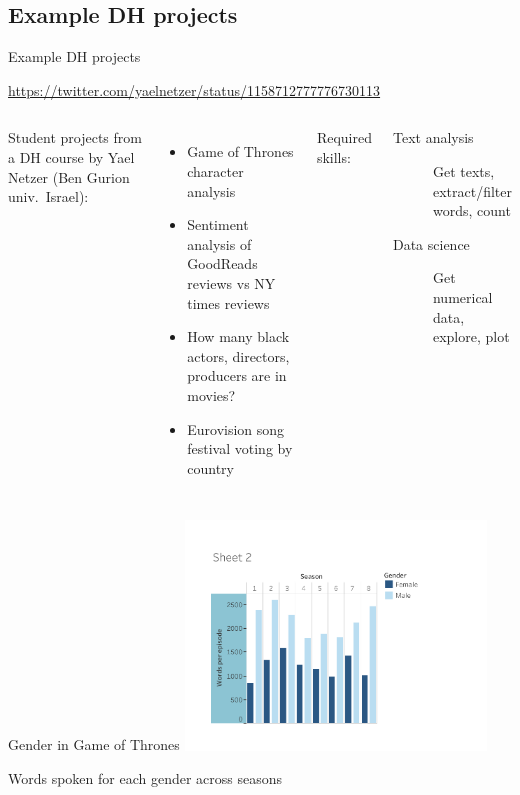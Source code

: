\documentclass[aspectratio=169,usenames,dvipsnames]{beamer}
\begin{document}
\subsection{Example DH projects}
\frame{\tableofcontents[currentsubsection]}
\begin{frame}{Example DH projects}
\begin{reference}
\url{https://twitter.com/yaelnetzer/status/1158712777776730113}
\end{reference}
    \begin{columns}
            Student projects from a DH course by Yael Netzer (Ben Gurion univ.\ Israel):
            \begin{itemize}
                \item Game of Thrones character analysis
                \item Sentiment analysis of GoodReads reviews vs NY times reviews
                \item How many black actors, directors,
                    producers are in movies?
                \item Eurovision song festival voting by country
            \end{itemize}
        \pause
            Required skills:
            \begin{description}
                \item[Text analysis] Get texts, extract/filter words, count
                \item[Data science] Get numerical data, explore, plot
            \end{description}
    \end{columns}
\end{frame}

\begin{frame}{Gender in Game of Thrones}\centering
    \includegraphics[width=0.6\textwidth]{fig/got}

    Words spoken for each gender across seasons
\end{frame}
\end{document}
